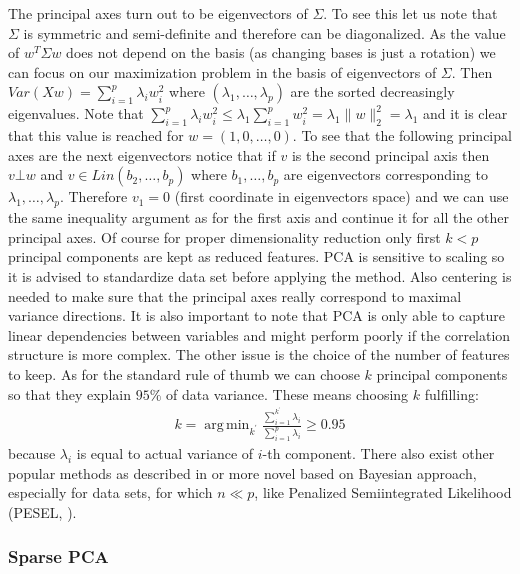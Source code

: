 \documentclass[shortabstract, english, mgr]{iithesis}
\DeclareMathOperator*{\argmin}{arg\,min}
\begin{document}
The principal axes turn out to be eigenvectors of $\Sigma$. To see this let us note that $\Sigma$ is symmetric and semi-definite and therefore can be diagonalized. As the value of $w^T\Sigma w$ does not depend on the basis (as changing bases is just a rotation) we can focus on our maximization problem in the basis of eigenvectors of $\Sigma$. Then $Var(Xw) = \sum_{i=1}^p \lambda_i w_i^2$ where $(\lambda_1, \ldots, \lambda_p)$ are the sorted decreasingly eigenvalues. Note that $\sum_{i=1}^p \lambda_i w_i^2 \leq \lambda_1 \sum_{i=1}^p w_i^2 = \lambda_1 \| w\|_2^2 = \lambda_1$ and it is clear that this value is reached for $w = (1, 0, \ldots, 0)$. To see that the following principal axes are the next eigenvectors notice that if $v$ is the second principal axis then $v \bot w$ and $v \in Lin(b_2, \ldots, b_p)$ where $b_1, \ldots, b_p$ are eigenvectors corresponding to $\lambda_1, \ldots, \lambda_p$. Therefore $v_1 = 0$ (first coordinate in eigenvectors space) and we can use the same inequality argument as for the first axis and continue it for all the other principal axes. Of course for proper dimensionality reduction only first $k < p$ principal components are kept as reduced features. PCA is sensitive to scaling so it is advised to standardize data set before applying the method. Also centering is needed to make sure that the principal axes really correspond to maximal variance directions. It is also important to note that PCA is only able to capture linear dependencies between variables and might perform poorly if the correlation structure is more complex. The other issue is the choice of the number of features to keep. As for the standard rule of thumb we can choose $k$ principal components so that they explain $95\%$ of data variance. These means choosing $k$ fulfilling:
\begin{align*}
    k = \argmin_{k^{\prime}} \frac{\sum_{i=1}^{k^{\prime}} \lambda_i }{\sum_{i=1}^p \lambda_i} \geq 0.95
\end{align*}
because $\lambda_i$ is equal to actual variance of $i$-th component. There also exist other popular methods as described in \cite[chapter 6]{PCA} or more novel based on Bayesian approach, especially for data sets, for which $n \ll p$, like Penalized Semiintegrated Likelihood (PESEL, \cite{pesel}). 

\subsubsection{Sparse PCA}
\end{document}
